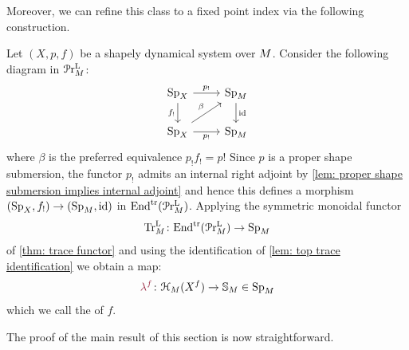 Moreover, we can refine this class to a fixed point index via the following construction.

\begin{cons}\label{cons: Lefschetz index}
    Let $(X,p,f)$ be a shapely dynamical system over $M$. 
    Consider the following diagram in $\mathcal{P}\mathrm{r}^{\mathrm{L}}_{M}$:
   \[\begin{tikzcd}
	{\pSp{X}} & {\pSp{\base}} \\
	{\pSp{X}} & {\pSp{\base}}
	\arrow["{p_!}", from=1-1, to=1-2]
	\arrow["{f_!}"', from=1-1, to=2-1]
	\arrow["\id", from=1-2, to=2-2]
	\arrow["\beta" Rightarrow, from=2-1, to=1-2]
	\arrow["{p_!}"', from=2-1, to=2-2]
\end{tikzcd} \]
where $\beta$ is the preferred equivalence $p_!f_!=p!$
Since $p$ is a proper shape submersion,
the functor $p_!$ admits an internal right adjoint by 
\autoref{lem: proper shape submersion implies internal adjoint}
and hence this defines a morphism $(\pSp{X},f_!)\to (\pSp{\base},\id)$ in $\mathrm{End}^{\mathrm{tr}}(\mathcal{P}\mathrm{r}^{\mathrm{L}}_{M})$. 
Applying the symmetric monoidal functor 
\[ \TrcL\colon \Endtrl(\pPrlf{\base}) \to \pSp{\base}\]
of \autoref{thm: trace functor} and using the identification of 
\autoref{lem: top trace identification} we obtain a map:
\[ \mdef{\lambda^f}\colon \cptSec{X^f}[\base]
\to \SS_{\base} \in \pSp{\base}\]
which we call the  of $f$. 
\end{cons}

The proof of the main result of this section is now straightforward.

